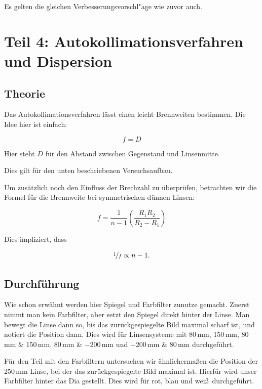 \documentclass[11pt,a4paper]{article}
\begin{document}
Es gelten die gleichen Verbesserungsvorschl"age wie zuvor auch.

\section{Teil 4: Autokollimationsverfahren und Dispersion}

\subsection{Theorie}

Das Autokollimationsverfahren l\"asst einen leicht Brennweiten bestimmen. Die Idee hier ist einfach:

\begin{equation}
f=D\label{eq:7}
\end{equation}

Hier steht $D$ f\"ur den Abstand zwischen Gegenstand und Linsenmitte.

Dies gilt f\"ur den unten beschriebenen Versuchsaufbau.

Um zus\"atzlich noch den Einfluss der Brechzahl zu \"uberpr\"ufen, betrachten wir die Formel f\"ur die Brennweite bei symmetrischen d\"unnen Linsen:

\begin{equation}
f=\frac{1}{n-1}\left(\frac{R_1R_2}{R_2-R_1}\right)\label{eq:8}
\end{equation}

Dies impliziert, dass

\begin{equation}
\nicefrac{1}{f}\propto n-1.\label{eq:9}
\end{equation}

\subsection{Durchführung}

Wie schon erw\"ahnt werden hier Spiegel und Farbfilter zunutze gemacht. Zuerst nimmt man kein Farbfilter, aber setzt den Spiegel direkt hinter der Linse. Man bewegt die Linse dann so, bis das zur\"uckgespiegelte Bild maximal scharf ist, und notiert die Position dann. Dies wird f\"ur Linsensysteme mit 80\,mm, 150\,mm, 80\,mm \& 150\,mm, 80\,mm \& $-200$\,mm und $-200$\,mm \& 80\,mm durchgef\"uhrt.

F\"ur den Teil mit den Farbfiltern untersuchen wir \"ahnlicherma\ss en die Position der 250\,mm Linse, bei der das zur\"uckgespiegelte Bild maximal ist. Hierf\"ur wird unser Farbfilter hinter das Dia gestellt. Dies wird f\"ur rot, blau und wei\ss\ durchgef\"uhrt.
\end{document}
